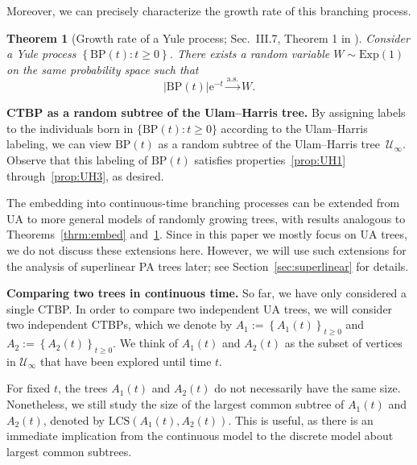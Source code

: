 \documentclass[11pt]{article}
\numberwithin{equation}{section}
\newcommand{\Exp}{\mathrm{Exp}} %
\newcommand{\MCST}{\mathrm{LCS}} %
\newcommand{\be}{\begin{equation}}
\newcommand{\ee}{\end{equation}}
\newcommand{\bp}{\mathrm{BP}}
\newcommand{\e}{\mathrm e}
\def\cU{{\mathcal U}}
\newtheorem{theorem}{Theorem}[section]
\theoremstyle{definition}
\begin{document}
Moreover, we can precisely characterize the growth rate of this branching process.  

\begin{theorem}[Growth rate of a Yule process; Sec.~III.7, Theorem 1 in \cite{AthrNey72}]\label{thrm:malt}
Consider a Yule process $\left\{\bp(t): t\geq 0 \right\}$. 
There exists a random variable $W \sim \Exp(1)$ on the same probability space such that 
\be 
|\bp(t)|\e^{- t}\overset{\mathrm{a.s.}}{\longrightarrow}W. 
\ee 
\end{theorem}


\textbf{CTBP as a random subtree of the Ulam--Harris tree.}
By assigning labels to the individuals born in $\{\bp(t):t\geq 0\}$ according to the Ulam--Harris labeling, we can view $\bp(t)$ as a random subtree of the Ulam--Harris tree~$\cU_\infty$. Observe that this labeling of $\bp(t)$ satisfies properties~\ref{prop:UH1} through~\ref{prop:UH3}, as desired.

The embedding into continuous-time branching processes can be extended from UA to more general models of randomly growing trees, with results analogous to Theorems~\ref{thrm:embed} and~\ref{thrm:malt}. 
Since in this paper we mostly focus on UA trees, we do not discuss these extensions here. 
However, we will use such extensions for the analysis of superlinear PA trees later; see Section~\ref{sec:superlinear} for details. 

\textbf{Comparing two trees in continuous time.}
So far, we have only considered a single CTBP. In order to compare two independent UA trees, we will consider two independent CTBPs, which we denote by $A_{1} := \left\{ A_{1} (t) \right\}_{t\geq 0}$ and $A_{2} := \left\{ A_{2} (t) \right\}_{t\geq 0}$. We think of $A_1 (t)$ and $A_2 (t)$ as the subset of vertices in $\mathcal{U}_\infty$ that have been explored until time $t$. 

For fixed $t$, the trees $A_1(t)$ and $A_2(t)$ do not necessarily have the same size. Nonetheless, we still study the size of the largest common subtree of $A_1(t)$ and $A_2(t)$, denoted by $\MCST\left( A_1(t), A_2(t) \right)$. This is useful, as there is an immediate implication from the continuous model to the discrete model about largest common subtrees.
\end{document}
